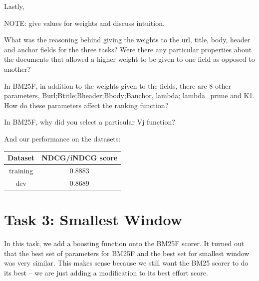 \documentclass[10pt,twocolumn]{article}
\begin{document}
Lastly, 


NOTE: give values for weights and discuss intuition.

What was the reasoning behind giving the weights to the url, title,
body, header and anchor fields for the three tasks? Were there any
particular properties about the documents that allowed a higher weight
to be given to one field as opposed to another?

In BM25F, in addition to the weights given to the fields, there are
8 other parameters, Burl;Btitle;Bheader;Bbody;Banchor, lambda; lambda\_prime and K1.
How do these parameters affect the ranking function?

In BM25F, why did you select a particular Vj function?

And our performance on the datasets:
\begin{table}[H]
\centering
\begin{tabular}{|c|c|}
\hline
Dataset & NDCG/iNDCG score \\\hline
training & 0.8883\\\hline
dev & 0.8689\\\hline
\end{tabular}
\end{table}
\section*{Task 3: Smallest Window}
In this task, we add a boosting function onto the BM25F scorer. It turned out that the best set of parameters for BM25F and the best set for smallest window was very similar. This makes sense because we still want the BM25 scorer to do its best -- we are just adding a modification to its best effort score. 
\end{document}
